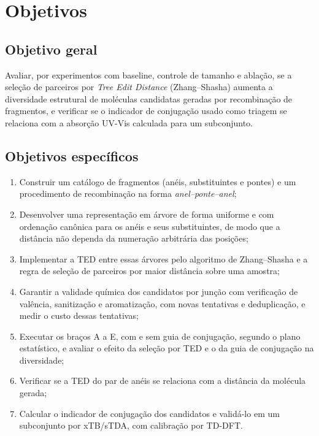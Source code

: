 \chapter{Objetivos}
\label{cap:objetivos}

\section{Objetivo geral}
\label{sec:objetivo-geral}

Avaliar, por experimentos com baseline, controle de tamanho e ablação, se a seleção de parceiros por \textit{Tree Edit Distance} (Zhang--Shasha) aumenta a diversidade estrutural de moléculas candidatas geradas por recombinação de fragmentos, e verificar se o indicador de conjugação usado como triagem se relaciona com a absorção UV-Vis calculada para um subconjunto.

\section{Objetivos específicos}
\label{sec:objetivos-especificos}

\begin{enumerate}
	\item Construir um catálogo de fragmentos (anéis, substituintes e pontes) e um procedimento de recombinação na forma \textit{anel--ponte--anel};
	\item Desenvolver uma representação em árvore de forma uniforme e com ordenação canônica para os anéis e seus substituintes, de modo que a distância não dependa da numeração arbitrária das posições;
	\item Implementar a TED entre essas árvores pelo algoritmo de Zhang--Shasha e a regra de seleção de parceiros por maior distância sobre uma amostra;
	\item Garantir a validade química dos candidatos por junção com verificação de valência, sanitização e aromatização, com novas tentativas e deduplicação, e medir o custo dessas tentativas;
	\item Executar os braços A a E, com e sem guia de conjugação, segundo o plano estatístico, e avaliar o efeito da seleção por TED e o da guia de conjugação na diversidade;
	\item Verificar se a TED do par de anéis se relaciona com a distância da molécula gerada;
	\item Calcular o indicador de conjugação dos candidatos e validá-lo em um subconjunto por xTB/sTDA, com calibração por TD-DFT.
\end{enumerate}


